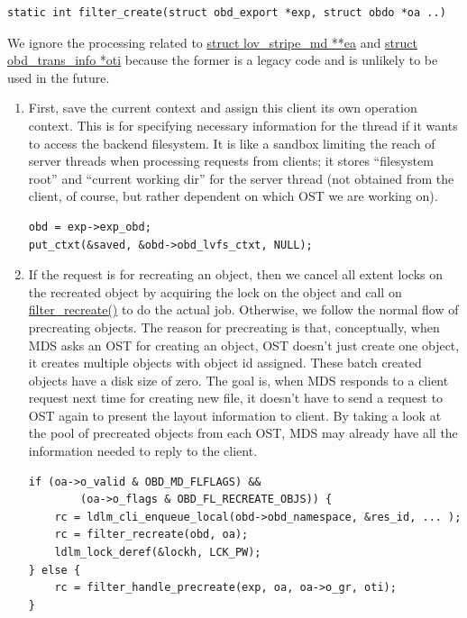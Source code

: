 \begin{Verbatim}
static int filter_create(struct obd_export *exp, struct obdo *oa ..)
\end{Verbatim}

We ignore the processing related to \url{struct lov_stripe_md **ea} and
\url{struct obd_trans_info *oti} because the former is a legacy code and
is unlikely to be used in the future.

\begin{enumerate}

\item First, save the current context and assign this client its own operation
context. This is for specifying necessary information for the thread if it
wants to access the backend filesystem. It is like a sandbox limiting the
reach of server threads when processing requests from clients; it stores
``filesystem root'' and ``current working dir'' for the server thread (not
obtained from the client, of course, but rather dependent on which OST
we are working on).


\begin{Verbatim}
obd = exp->exp_obd;
put_ctxt(&saved, &obd->obd_lvfs_ctxt, NULL);
\end{Verbatim}

\item If the request is for recreating an object, then we cancel all extent
locks on the recreated object by acquiring the lock on the object and call on
\url{filter_recreate()} to do the actual job. Otherwise, we follow the normal
flow of precreating objects.  The reason for precreating is that, conceptually,
when MDS asks an OST for creating an object, OST doesn't just create one
object, it creates multiple objects with object id assigned. These batch
created objects have a disk size of zero.  The goal is, when MDS responds to a
client request next time for creating new file, it doesn't have to send a
request to OST again to present the layout information to client. By taking a
look at the pool of precreated objects from each OST, MDS may already have
all the information needed to reply to the client. 

\begin{Verbatim}
if (oa->o_valid & OBD_MD_FLFLAGS) && 
        (oa->o_flags & OBD_FL_RECREATE_OBJS)) {
    rc = ldlm_cli_enqueue_local(obd->obd_namespace, &res_id, ... );
    rc = filter_recreate(obd, oa);
    ldlm_lock_deref(&lockh, LCK_PW);
} else {
    rc = filter_handle_precreate(exp, oa, oa->o_gr, oti);
}
\end{Verbatim}


\end{enumerate}
